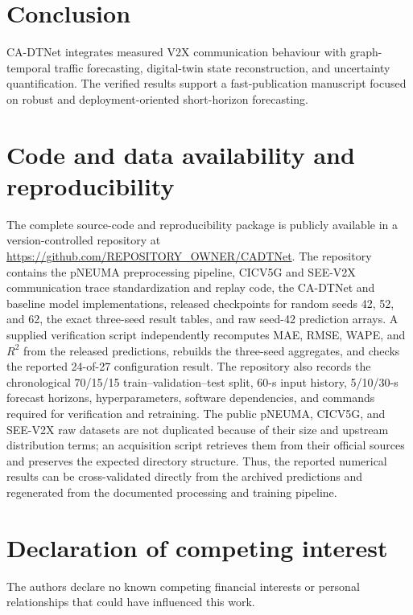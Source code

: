 \documentclass[preprint,12pt]{elsarticle}
\newcommand{\repositoryurl}{https://github.com/REPOSITORY_OWNER/CADTNet}
\begin{document}
\section{Conclusion}
CA-DTNet integrates measured V2X communication behaviour with graph-temporal
traffic forecasting, digital-twin state reconstruction, and uncertainty
quantification. The verified results support a fast-publication manuscript
focused on robust and deployment-oriented short-horizon forecasting.

\section*{Code and data availability and reproducibility}
The complete source-code and reproducibility package is publicly available in
a version-controlled repository at \url{\repositoryurl}. The repository
contains the pNEUMA preprocessing pipeline, CICV5G and SEE-V2X communication
trace standardization and replay code, the CA-DTNet and baseline model
implementations, released checkpoints for random seeds 42, 52, and 62, the
exact three-seed result tables, and raw seed-42 prediction arrays. A supplied
verification script independently recomputes MAE, RMSE, WAPE, and $R^2$ from
the released predictions, rebuilds the three-seed aggregates, and checks the
reported 24-of-27 configuration result. The repository also records the
chronological 70/15/15 train--validation--test split, 60-s input history,
5/10/30-s forecast horizons, hyperparameters, software dependencies, and
commands required for verification and retraining. The public pNEUMA,
CICV5G, and SEE-V2X raw datasets are not duplicated because of their size and
upstream distribution terms; an acquisition script retrieves them from their
official sources and preserves the expected directory structure. Thus, the
reported numerical results can be cross-validated directly from the archived
predictions and regenerated from the documented processing and training
pipeline.

\section*{Declaration of competing interest}
The authors declare no known competing financial interests or personal
relationships that could have influenced this work.
\end{document}
